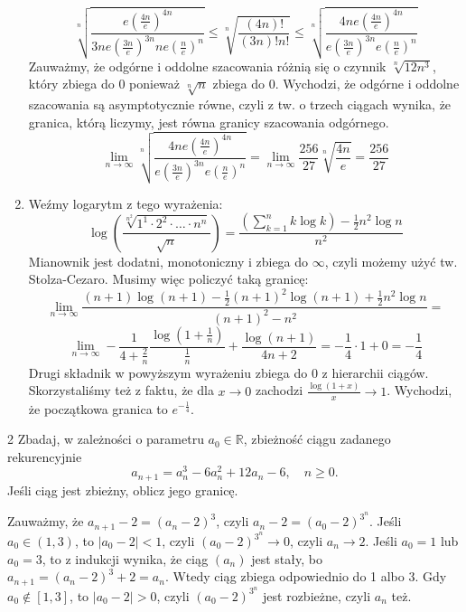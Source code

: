 \documentclass{../note}
\begin{document}
\begin{rozwiazanie}
\begin{enumerate}[label=(\alph*)]
    \[\sqrt[n]{\frac{e\left(\frac{4n}{e}\right)^{4n}}{3ne\left(\frac{3n}{e}\right)^{3n}ne\left(\frac{n}{e}\right)^n}} \leq \sqrt[n]{\frac{(4n)!}{(3n)!n!}} \leq \sqrt[n]{\frac{4ne\left(\frac{4n}{e}\right)^{4n}}{e\left(\frac{3n}{e}\right)^{3n}e\left(\frac{n}{e}\right)^n}}\]
    Zauważmy, że odgórne i oddolne szacowania różnią się o czynnik $\sqrt[n]{12n^3}$, który zbiega do 0 ponieważ $\sqrt[n]{n}$ zbiega do 0. Wychodzi, że odgórne i oddolne szacowania są asymptotycznie równe, czyli z tw. o trzech ciągach wynika, że granica, którą liczymy, jest równa granicy szacowania odgórnego.
    \[\lim_{n\to\infty} \sqrt[n]{\frac{4ne\left(\frac{4n}{e}\right)^{4n}}{e\left(\frac{3n}{e}\right)^{3n}e\left(\frac{n}{e}\right)^n}} = \lim_{n\to\infty} \frac{256}{27} \sqrt[n]{\frac{4n}{e}} = \frac{256}{27}\]
    \item Weźmy logarytm z tego wyrażenia:
    \[\log\left(\frac{\sqrt[n^{2}]{1^{1}\cdot 2^{2}\cdot\ldots\cdot n^{n}}}{\sqrt{n}}\right) = \frac{\left(\sum_{k = 1}^{n} k\log k\right) - \frac12n^2\log n}{n^2}\]
    Mianownik jest dodatni, monotoniczny i zbiega do $\infty$, czyli możemy użyć tw. Stolza-Cezaro. Musimy więc policzyć taką granicę:
    \[\lim_{n\to\infty} \frac{(n+1)\log(n+1) - \frac12(n+1)^2\log(n+1) + \frac12n^2\log n}{(n+1)^2 - n^2} =\]
    \[\lim_{n\to\infty} -\frac{1}{4+\frac2n} \frac{\log(1 + \frac1n)}{\frac1n} + \frac{\log(n+1)}{4n+2} = -\frac14 \cdot 1 + 0 = -\frac14\]
    Drugi składnik w powyższym wyrażeniu zbiega do 0 z hierarchii ciągów. Skorzystaliśmy też z faktu, że dla $x \to 0$ zachodzi $\frac{\log(1+x)}{x} \to 1$. Wychodzi, że początkowa granica to $e^{-\frac14}$.
\end{enumerate}
\end{rozwiazanie}

\begin{zadanie}{2}
Zbadaj, w zależności o parametru \( a_{0}\in\mathbb{R} \), zbieżność ciągu zadanego rekurencyjnie
\[ a_{n+1}=a_{n}^{3}-6a_{n}^{2}+12a_{n}-6, \quad n\ge0. \]
Jeśli ciąg jest zbieżny, oblicz jego granicę.
\end{zadanie}
\begin{rozwiazanie}
Zauważmy, że $a_{n+1} - 2 = (a_n - 2)^3$, czyli $a_n - 2 = (a_0 - 2)^{3^n}$. Jeśli $a_0 \in (1, 3)$, to $|a_0 - 2| < 1$, czyli $(a_0 - 2)^{3^n} \to 0$, czyli $a_n \to 2$. Jeśli $a_0 = 1$ lub $a_0 = 3$, to z indukcji wynika, że ciąg $(a_n)$ jest stały, bo $a_{n+1} = (a_n - 2)^3 + 2 = a_n$. Wtedy ciąg zbiega odpowiednio do 1 albo 3. Gdy $a_0 \notin [1, 3]$, to $|a_0 - 2| > 0$, czyli $(a_0 - 2)^{3^n}$ jest rozbieżne, czyli $a_n$ też.
\end{rozwiazanie}
\end{document}

